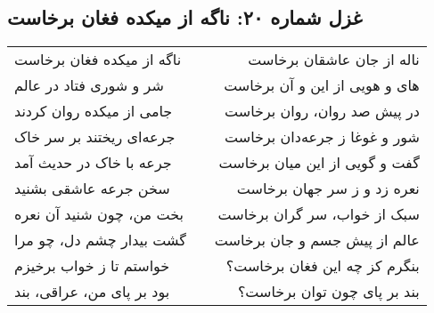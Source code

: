 \begin{center}
\section*{غزل شماره ۲۰: ناگه از میکده فغان برخاست}
\label{sec:020}
\begin{longtable}{l p{0.5cm} r}
ناگه از میکده فغان برخاست
&&
ناله از جان عاشقان برخاست
\\
شر و شوری فتاد در عالم
&&
های و هویی از این و آن برخاست
\\
جامی از میکده روان کردند
&&
در پیش صد روان، روان برخاست
\\
جرعه‌ای ریختند بر سر خاک
&&
شور و غوغا ز جرعه‌دان برخاست
\\
جرعه با خاک در حدیث آمد
&&
گفت و گویی از این میان برخاست
\\
سخن جرعه عاشقی بشنید
&&
نعره زد و ز سر جهان برخاست
\\
بخت من، چون شنید آن نعره
&&
سبک از خواب، سر گران برخاست
\\
گشت بیدار چشم دل، چو مرا
&&
عالم از پیش جسم و جان برخاست
\\
خواستم تا ز خواب برخیزم
&&
بنگرم کز چه این فغان برخاست؟
\\
بود بر پای من، عراقی، بند
&&
بند بر پای چون توان برخاست؟
\\
\end{longtable}
\end{center}
